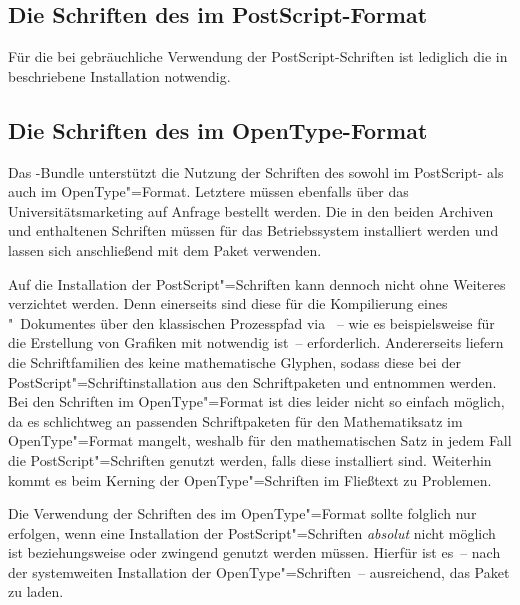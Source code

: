 \begin{Declaration*}{}
\begin{Declaration*}{}
\begin{Declaration*}{}
\subsection{Die Schriften des \CDs im PostScript-Format}
%
%
Für die bei  gebräuchliche Verwendung der PostScript-Schriften 
ist lediglich die in  beschriebene Installation notwendig. 


\subsection{Die Schriften des \CDs im OpenType-Format}
%
%
%
Das \TUDScript-Bundle unterstützt die Nutzung der Schriften des \CDs sowohl 
im PostScript- als auch im OpenType"=Format. Letztere müssen ebenfalls über das 
%
{Universitätsmarketing auf Anfrage} bestellt werden. Die in den beiden Archiven 
 und  enthaltenen Schriften 
müssen für das Betriebssystem installiert werden und lassen sich anschließend 
mit dem Paket  verwenden.

Auf die Installation der PostScript"=Schriften kann dennoch nicht ohne Weiteres 
verzichtet werden. Denn einerseits sind diese für die Kompilierung eines 
"~Dokumentes über den klassischen Prozesspfad via
~-- wie es 
beispielsweise für die Erstellung von Grafiken mit  notwendig 
ist~-- erforderlich. Andererseits liefern die Schriftfamilien des \CDs keine 
mathematische Glyphen, sodass diese bei der PostScript"=Schriftinstallation aus 
den Schriftpaketen  und  entnommen werden. Bei 
den Schriften im OpenType"=Format ist dies leider nicht so einfach möglich, da 
es schlichtweg an passenden Schriftpaketen für den Mathematiksatz im 
OpenType"=Format mangelt, weshalb für den mathematischen Satz in jedem Fall die 
PostScript"=Schriften genutzt werden, falls diese installiert sind. Weiterhin 
kommt es beim Kerning der OpenType"=Schriften im Fließtext zu Problemen.

Die Verwendung der Schriften des \CDs im OpenType"=Format sollte folglich nur 
erfolgen, wenn eine Installation der PostScript"=Schriften \emph{absolut} nicht 
möglich ist beziehungsweise  oder  zwingend 
genutzt werden müssen. Hierfür ist es~-- nach der systemweiten Installation der 
OpenType"=Schriften~-- ausreichend, das Paket  zu laden.
%




\end{Declaration*}
\end{Declaration*}
\end{Declaration*}
